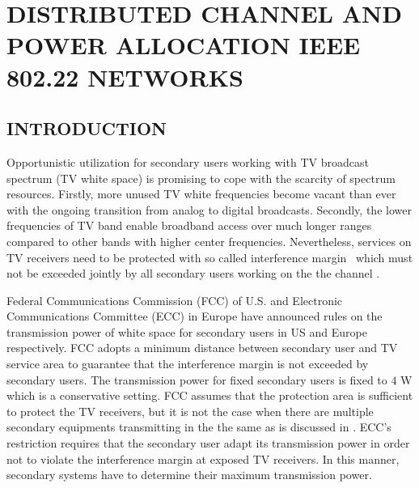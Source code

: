 \chapter{DISTRIBUTED CHANNEL AND POWER ALLOCATION IEEE 802.22 NETWORKS}

\section{INTRODUCTION}

Opportunistic utilization for secondary users working with TV broadcast spectrum (TV white space) is promising to cope with the scarcity of spectrum resources\cite{FCC_2010_sedond_memorandumm}. Firstly, more unused TV white frequencies become vacant than ever with the ongoing transition from analog to digital broadcasts. Secondly, the lower frequencies of TV band enable broadband access over much longer ranges compared to other bands with higher center frequencies. Nevertheless, services on TV receivers need to be protected with so called interference margin~\cite{multipleIntf_pimrc11} which must not be exceeded jointly by all secondary users working on the the channel .

Federal Communications Commission (FCC) of U.S. and Electronic Communications Committee (ECC) in Europe have announced rules on the transmission power of white space for secondary users in US and Europe respectively\cite{FCC_2010_sedond_memorandumm, ecc159}. FCC adopts a minimum distance between secondary user and TV service area to guarantee that the interference margin is not exceeded by secondary users. The transmission power for fixed secondary users is fixed to $4$ W which is a conservative setting. %
FCC assumes that the protection area is sufficient to protect the TV receivers, but it is not the case when there are multiple secondary equipments transmitting in the the same as is discussed in \cite{Jaentti11}. ECC's restriction requires that the secondary user adapt its transmission power in order not to violate the interference margin at exposed TV receivers. In this manner, secondary systems have to determine their maximum transmission power.

